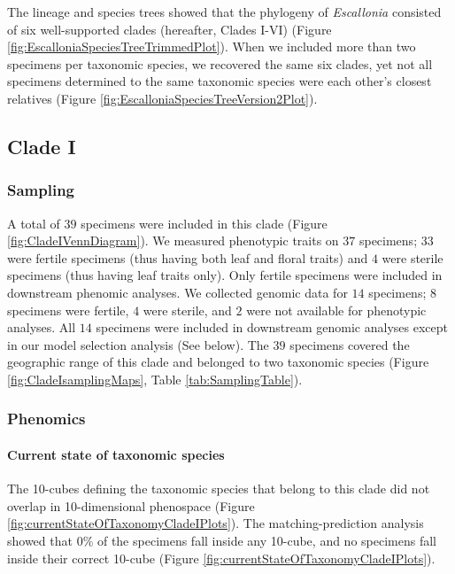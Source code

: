 \documentclass[
  11pt,
]{article}
\begin{document}
The lineage and species trees showed that the phylogeny of \emph{Escallonia} consisted of six well-supported clades (hereafter, Clades I-VI) (Figure \ref{fig:EscalloniaSpeciesTreeTrimmedPlot}). When we included more than two specimens per taxonomic species, we recovered the same six clades, yet not all specimens determined to the same taxonomic species were each other's closest relatives (Figure \ref{fig:EscalloniaSpeciesTreeVersion2Plot}).

\hypertarget{clade-i}{%
\subsection{Clade I}\label{clade-i}}

\hypertarget{sampling-1}{%
\subsubsection{Sampling}\label{sampling-1}}

A total of \(39\) specimens were included in this clade (Figure \ref{fig:CladeIVennDiagram}). We measured phenotypic traits on \(37\) specimens; \(33\) were fertile specimens (thus having both leaf and floral traits) and \(4\) were sterile specimens (thus having leaf traits only). Only fertile specimens were included in downstream phenomic analyses. We collected genomic data for \(14\) specimens; \(8\) specimens were fertile, \(4\) were sterile, and \(2\) were not available for phenotypic analyses. All \(14\) specimens were included in downstream genomic analyses except in our model selection analysis (See below). The \(39\) specimens covered the geographic range of this clade and belonged to two taxonomic species (Figure \ref{fig:CladeIsamplingMaps}, Table \ref{tab:SamplingTable}).

\hypertarget{phenomics-1}{%
\subsubsection{Phenomics}\label{phenomics-1}}

\hypertarget{current-state-of-taxonomic-species}{%
\paragraph{Current state of taxonomic species}\label{current-state-of-taxonomic-species}}

The 10-cubes defining the taxonomic species that belong to this clade did not overlap in 10-dimensional phenospace (Figure \ref{fig:currentStateOfTaxonomyCladeIPlots}). The matching-prediction analysis showed that \(0\)\% of the specimens fall inside any 10-cube, and no specimens fall inside their correct 10-cube (Figure \ref{fig:currentStateOfTaxonomyCladeIPlots}).
\end{document}
